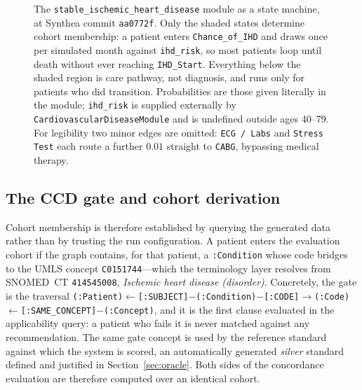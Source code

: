 \begin{figure}[h]
\caption{The \texttt{stable\_ischemic\_heart\_disease} module as a state machine, at Synthea
commit \texttt{aa0772f}. Only the shaded states determine cohort membership: a patient enters
\texttt{Chance\_of\_IHD} and draws once per simulated month against \texttt{ihd\_risk}, so most
patients loop until death without ever reaching \texttt{IHD\_Start}. Everything below the
shaded region is care pathway, not diagnosis, and runs only for patients who did transition.
Probabilities are those given literally in the module; \texttt{ihd\_risk} is supplied
externally by \texttt{CardiovascularDiseaseModule} and is undefined outside ages 40--79. For
legibility two minor edges are omitted: \texttt{ECG / Labs} and \texttt{Stress Test} each route
a further $0.01$ straight to \texttt{CABG}, bypassing medical therapy.}
\label{fig:sihd-module}
\end{figure}

\subsection{The CCD gate and cohort derivation}
\label{sec:gate}
Cohort membership is therefore established by querying the generated data rather than by
trusting the run configuration. A patient enters the evaluation cohort if the graph contains,
for that patient, a \texttt{:Condition} whose code bridges to the UMLS concept
\texttt{C0151744}---which the terminology layer resolves from SNOMED~CT \texttt{414545008},
\emph{Ischemic heart disease (disorder)}. Concretely, the gate is the traversal
\texttt{(:Patient)$\leftarrow$[:SUBJECT]$-$(:Condition)$-$[:CODE]$\rightarrow$(:Code)
$\leftarrow$[:SAME\_CONCEPT]$-$(:Concept)}, and it is the first clause evaluated in the
applicability query: a patient who fails it is never matched against any recommendation.
The same gate concept is used by the reference standard against which the system is scored,
an automatically generated \emph{silver} standard defined and justified in
Section~\ref{sec:oracle}. Both sides of the concordance evaluation are therefore computed
over an identical cohort.


